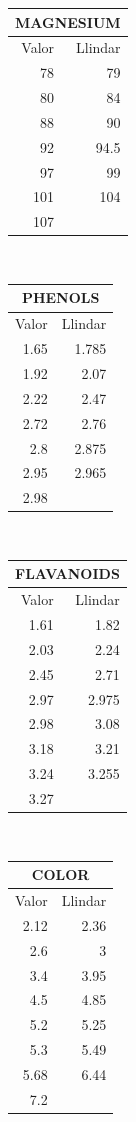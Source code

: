 \documentclass{article} %
\begin{document}
{	{\selectfont\small
	\begin{tabular}{r | r}
	 	\multicolumn{2}{c}{MAGNESIUM}  \\ \hline
	 	Valor & Llindar \\ \hline
		78 & 79 \\
		80 & 84 \\
		88 & 90 \\
		92 & 94.5 \\
		97 & 99 \\
		101 & 104 \\
		107 &  \\
	\end{tabular}
	} \\

	{\selectfont\small
	\begin{tabular}{r | r}
	 	\multicolumn{2}{c}{PHENOLS} \\ \hline
	 	Valor & Llindar \\ \hline
		1.65 & 1.785 \\
		1.92 & 2.07 \\
		2.22 & 2.47 \\
		2.72 & 2.76 \\
		2.8 & 2.875 \\
		2.95 & 2.965 \\
		2.98 &  \\
	\end{tabular}
	} \\

	{\selectfont\small
	\begin{tabular}{r | r}
	 	\multicolumn{2}{c}{FLAVANOIDS} \\ \hline
	 	Valor & Llindar \\ \hline
		1.61 & 1.82 \\
		2.03 & 2.24 \\
		2.45 & 2.71 \\
		2.97 & 2.975 \\
		2.98 & 3.08 \\
		3.18 & 3.21 \\
		3.24 & 3.255 \\
		3.27 &  \\
	\end{tabular}
	} \\
	
	{\selectfont\small
	\begin{tabular}{r | r}
	 	\multicolumn{2}{c}{COLOR} \\ \hline
	 	Valor & Llindar \\ \hline
		2.12 & 2.36 \\
		2.6 & 3 \\
		3.4 & 3.95 \\
		4.5 & 4.85 \\
		5.2 & 5.25 \\
		5.3 & 5.49 \\
		5.68 & 6.44 \\
		7.2 &  \\
	\end{tabular}
	} \\

}
\end{document}
